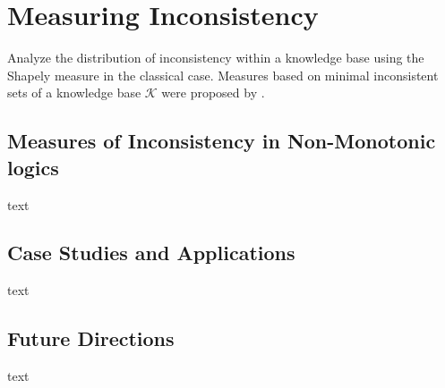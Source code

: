 \section{Measuring Inconsistency}
Analyze the distribution of inconsistency within a knowledge base using the Shapely measure \cite{hunter_measure_2010} in the classical case. Measures based on minimal inconsistent sets of a knowledge base \(\mathcal{K}\) \cite{jabbour_mis_2016} were proposed by \cite{ulbricht_measuring_2018}.

\subsection{Measures of Inconsistency in Non-Monotonic logics}
text

\subsection{Case Studies and Applications}
text

\subsection{Future Directions}
text
